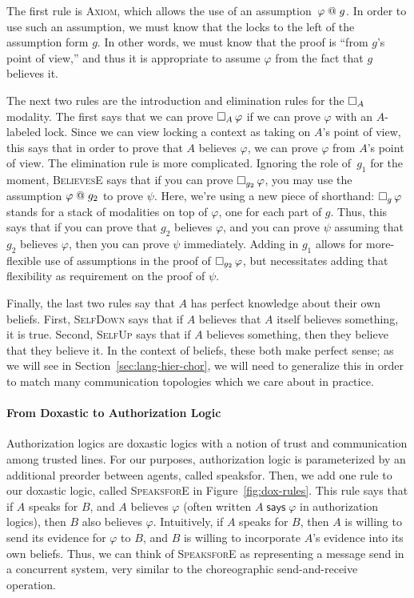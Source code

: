 The first rule is \textsc{Axiom}, which allows the use of an assumption~$\varphi \mathrel{@} g$.
In order to use such an assumption, we must know that the locks to the left of the assumption form $g$.
In other words, we must know that the proof is ``from $g$'s point of view,'' and thus it is appropriate to assume $\varphi$ from the fact that $g$ believes it.

The next two rules are the introduction and elimination rules for the $\mathop{\square_{A}} $ modality.
The first says that we can prove $\mathop{\square_{A}} \varphi$ if we can prove $\varphi$ with an $A$-labeled lock.
Since we can view locking a context as taking on $A$'s point of view, this says that in order to prove that $A$ believes $\varphi$, we can prove $\varphi$ from $A$'s point of view.
The elimination rule is more complicated.
Ignoring the role of~$g_1$ for the moment, \textsc{BelievesE} says that if you can prove $\mathop{\square_{g_2}} \varphi$, you may use the assumption $\varphi \mathrel{@} g_2$ to prove $\psi$.
Here, we're using a new piece of shorthand: $\mathop{\square_{g}} \varphi$ stands for a stack of modalities on top of $\varphi$, one for each part of $g$.
Thus, this says that if you can prove that $g_2$ believes $\varphi$, and you can prove $\psi$ assuming that $g_2$ believes $\varphi$, then you can prove $\psi$ immediately.
Adding in $g_1$ allows for more-flexible use of assumptions in the proof of $\mathop{\square_{g_2}} \varphi$, but necessitates adding that flexibility as requirement on the proof of $\psi$.

Finally, the last two rules say that $A$ has perfect knowledge about their own beliefs.
First, \textsc{SelfDown} says that if $A$ believes that $A$ itself believes something, it is true.
Second, \textsc{SelfUp} says that if $A$ believes something, then they believe that they believe it.
In the context of beliefs, these both make perfect sense; as we will see in Section~\ref{sec:lang-hier-chor}, we will need to generalize this in order to match many communication topologies which we care about in practice.

\paragraph{From Doxastic to Authorization Logic}
Authorization logics are doxastic logics with a notion of trust and communication among trusted lines.
For our purposes, authorization logic is parameterized by an additional preorder between agents, called \textsf{speaksfor}.
Then, we add one rule to our doxastic logic, called \textsc{SpeaksforE} in Figure~\ref{fig:dox-rules}.
This rule says that if $A$ speaks for $B$, and $A$ believes $\varphi$ (often written $A \mathrel{\textsf{says}} \varphi$ in authorization logics), then $B$ also believes $\varphi$.
Intuitively, if $A$ speaks for $B$, then $A$ is willing to send its evidence for $\varphi$ to $B$, and $B$ is willing to incorporate $A$'s evidence into its own beliefs.
Thus, we can think of \textsc{SpeaksforE} as representing a message send in a concurrent system, very similar to the choreographic send-and-receive operation.


